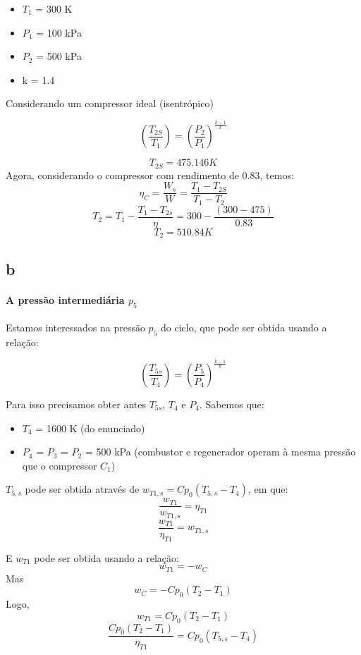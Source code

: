 \documentclass[a4paper, 12pt]{article}
\begin{document}
\begin{itemize}
\item $T_{1}$ = 300 K
\item $P_{1}$ = 100 kPa
\item $P_{2}$ = 500 kPa
\item k = 1.4
\end{itemize}

Considerando um compressor ideal (isentrópico)

\[\left( \frac{T_{2S}}{T_{1}}   \right) = \left( \frac{P_{2}}{P_{1}} \right)^{\frac{k-1}{k}} \]

\[T_{2S} = 475.146 K\]
Agora, considerando o compressor com rendimento de 0.83, temos:
\[\eta _{C} = \frac{W_{s}}{W} = \frac{T_{1} - T_{2S}}{T_{1} - T_{2}}\]
\[T_{2} = T_{1} - \frac{T_{1}-T_{2s}}{\eta} = 300 - \frac{(300-475)}{0.83}\]
\[T_{2} = 510.84 K\]

\subsection{b}
\paragraph*{A pressão intermediária $p_{5}$}
Estamos interessados na pressão $p_{5}$ do ciclo, que pode ser obtida usando a relação:

\begin{equation}
\left( \frac{T_{5s}}{T_{4}}   \right) = \left( \frac{P_{5}}{P_{4}} \right)^{\frac{k-1}{k}} 
\label{eq:1}
\end{equation}


Para isso precisamos obter antes $T_{5s}$, $T_{4}$ e $P_{4}$. Sabemos que:

\begin{itemize}
\item $T_{4}$ = 1600 K (do enunciado)
\item $P_{4}$ = $P_{3}$ = $P_{2}$ = 500 kPa (combustor e regenerador operam à mesma pressão que o compressor $C_{1}$)
\end{itemize}

$T_{5,s}$ pode ser obtida através de $w_{T1,s} = Cp_{0}(T_{5,s}-T_{4})$, em que:
\[\frac{w_{T1}}{w_{T1,s}} = \eta _{T1}  \]
\[\frac{w_{T1}}{ \eta _{T1} } =  w_{T1,s}   \]

E $w_{T1}$ pode ser obtida usando a relação:
\[ w_{T1} = -w_{C} \]
Mas 
\[w_{C} = -Cp_{0}(T_{2}-T_{1})\]
Logo,
\[w_{T1} = Cp_{0}(T_{2}-T_{1})\]
\[\frac{Cp_{0}(T_{2}-T_{1})}{ \eta _{T1} } =  Cp_{0}(T_{5,s}-T_{4})  \]
\end{document}
